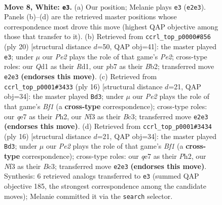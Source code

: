 \documentclass[11pt]{article}
\begin{document}
\begin{figure}[p]\centering
\begin{subfigure}{0.46\textwidth}\centering
\resizebox{\linewidth}{!}{%
\newchessgame
\chessboard[
  setfen={r1b2rk1/ppppqppp/2n1pn2/8/2PP4/2B2NP1/PP2PP1P/R2QKB1R w KQ - 1 8},
  showmover=false,
  pgfstyle=straightmove, color=movearrow, markmove={e2-e3}
]}
\caption{}
\end{subfigure}\hfill
\begin{subfigure}{0.46\textwidth}\centering
\resizebox{\linewidth}{!}{%
\newchessgame
\chessboard[
  setfen={r1b1r1k1/1pp1qppp/2nppn2/p7/2PP4/PPQ2N2/1B2PPPP/3RKB1R w K - 5 11},
  showmover=false,
  pgfstyle=straightmove, color=movearrow, markmove={e2-e3}
]}
\caption{}
\end{subfigure}
\\[4pt]
\begin{subfigure}{0.46\textwidth}\centering
\resizebox{\linewidth}{!}{%
\newchessgame
\chessboard[
  setfen={r1b2rk1/ppp1qppp/2nppn2/8/2PP4/P1B1PN2/1P3PPP/R2QKB1R w KQ - 1 9},
  showmover=false,
  pgfstyle=straightmove, color=movearrow, markmove={f1-d3}
]}
\caption{}
\end{subfigure}\hfill
\begin{subfigure}{0.46\textwidth}\centering
\resizebox{\linewidth}{!}{%
\newchessgame
\chessboard[
  setfen={r1b2rk1/ppp1qppp/2nppn2/8/2PP4/P1B1PN2/1P3PPP/R2QKB1R w KQ - 1 9},
  showmover=false,
  pgfstyle=straightmove, color=movearrow, markmove={f1-d3}
]}
\caption{}
\end{subfigure}
\caption{\textbf{Move 8, White: \texttt{e3}.} (a) Our position; Melanie plays \texttt{e3} (\texttt{e2e3}). Panels (b)--(d) are the retrieved master positions whose correspondence most drove this move (highest QAP objective among those that transfer to it). (b) Retrieved from \texttt{ccrl\_top\_p0000\#856} (ply 20) [structural distance $d$=50, QAP obj=41]: the master played \texttt{e3}; under $\mu$ our \emph{Pe2} plays the role of that game's \emph{Pe2}; cross-type roles: our \emph{Q}d1 as their \emph{R}d1, our \emph{p}b7 as their \emph{B}b2; transferred move \texttt{e2e3} \textbf{(endorses this move)}. (c) Retrieved from \texttt{ccrl\_top\_p0001\#3433} (ply 16) [structural distance $d$=21, QAP obj=34]: the master played \texttt{Bd3}; under $\mu$ our \emph{Pe2} plays the role of that game's \emph{Bf1} (a \textbf{cross-type} correspondence); cross-type roles: our \emph{q}e7 as their \emph{P}h2, our \emph{N}f3 as their \emph{B}c3; transferred move \texttt{e2e3} \textbf{(endorses this move)}. (d) Retrieved from \texttt{ccrl\_top\_p0001\#3434} (ply 16) [structural distance $d$=21, QAP obj=34]: the master played \texttt{Bd3}; under $\mu$ our \emph{Pe2} plays the role of that game's \emph{Bf1} (a \textbf{cross-type} correspondence); cross-type roles: our \emph{q}e7 as their \emph{P}h2, our \emph{N}f3 as their \emph{B}c3; transferred move \texttt{e2e3} \textbf{(endorses this move)}. Synthesis: 6 retrieved analogs transferred to \texttt{e3} (summed QAP objective 185, the strongest correspondence among the candidate moves); Melanie committed it via the \texttt{search} selector.}
\label{fig:thought-m14}
\end{figure}
\end{document}
